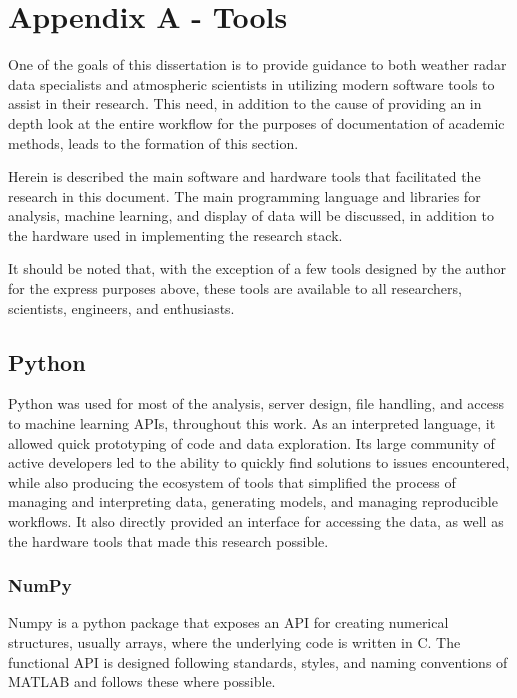 \chapter{Appendix A - Tools}
\label{sec:appendix-a-tools}

One of the goals of this dissertation is to provide guidance to both weather radar data specialists and atmospheric scientists in utilizing modern software tools to assist in their research.
 This need, in addition to the cause of providing an in depth look at the entire workflow for the purposes of documentation of academic methods, leads to the formation of this section.

Herein is described the main software and hardware tools that facilitated the research in this document. 
The main programming language and libraries for analysis, machine learning, and display of data will be discussed, in addition to the hardware used in implementing the research stack.

It should be noted that, with the exception of a few tools designed by the author for the express purposes above, these tools are available to all researchers, scientists, engineers, and enthusiasts.

\section{Python}
\label{ssec:appendix-a-python}

Python was used for most of the analysis, server design, file handling, and access to machine learning APIs, throughout this work. 
As an interpreted language, it allowed quick prototyping of code and data exploration. 
Its large community of active developers led to the ability to quickly find solutions to issues encountered, while also producing the ecosystem of tools that simplified the process of managing and interpreting data, generating models, and managing reproducible workflows. 
It also directly provided an interface for accessing the data, as well as the hardware tools that made this research possible.

\subsection{NumPy}
\label{ssec:appendix-a-numpy}

Numpy is a python package that exposes an API for creating numerical structures, usually arrays, where the underlying code is written in C.
The functional API is designed following standards, styles, and naming conventions of MATLAB and follows these where possible.

